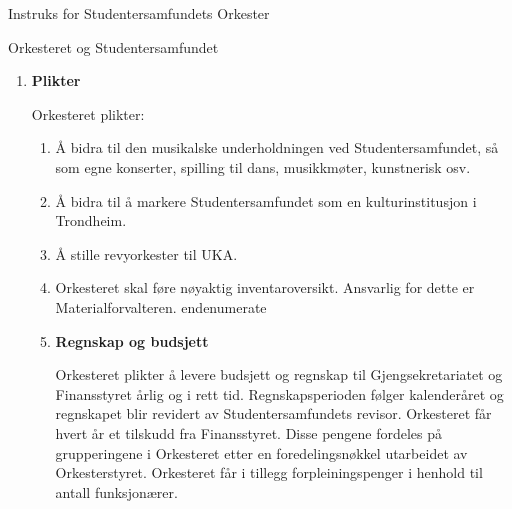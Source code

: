 \begin{instruks}{Instruks for Studentersamfundets Orkester}{ }{ }
\begin{instruksledd}{Orkesteret og Studentersamfundet}
\begin{enumerate}
                Orkesteret disponerer Musikerlåfte' under forutsetning av at instruksen for bruk av Musikerlåfte'
                blir fulgt.

                Studentersamfundet bevilger hvert år tilskudd til Orkesterets drift og kan bevilge midler til
                Orkesterets
                investeringer. Orkesteret og de faste gruppene kan også søke om ekstrabevilgninger fra Finansstyret
                for
                spesielle utgiftsposter. Orkesteret får utbetalt eventuelle godtgjørelser for utførte tjenester i
                Huset etter avtale
                i hvert enkelt tilfelle.

                Orkesteret kan etter avtale med Kontrollkontoret legge beslag på lokaler i Huset når dette er
                nødvendig for
                Orkesterets arbeid. Arbeidet skal utføres på en slik måte at det, så fremt det er mulig, ikke er til
                ulempe for
                annen utleie eller andre tilstelninger på Huset.

                Medlemmene av Orkesterstyret som har både tale- og stemmerett er funksjonærer ved Studentersamfundet
                i
                Trondhjem.

            \item \textbf{Plikter}

                Orkesteret plikter:

                \begin{enumerate}
                    \item Å bidra til den musikalske underholdningen ved Studentersamfundet, så som egne
                        konserter, spilling til
                        dans, musikkmøter, kunstnerisk osv.
                    \item Å bidra til å markere Studentersamfundet som en kulturinstitusjon i Trondheim.
                    \item Å stille revyorkester til UKA.
                    \item Orkesteret skal føre nøyaktig inventaroversikt. Ansvarlig for dette er
                        Materialforvalteren.
                        end{enumerate}

                    \item \textbf{Regnskap og budsjett}

                        Orkesteret plikter å levere budsjett og regnskap til Gjengsekretariatet og Finansstyret årlig og i
                        rett tid.
                        Regnskapsperioden følger kalenderåret og regnskapet blir revidert av Studentersamfundets revisor.
                        Orkesteret får hvert år et tilskudd fra Finansstyret. Disse pengene fordeles på grupperingene i
                        Orkesteret etter
                        en foredelingsnøkkel utarbeidet av Orkesterstyret. Orkesteret får i tillegg forpleiningspenger i
                        henhold til
                        antall funksjonærer.


\end{enumerate}
\end{enumerate}
\end{instruksledd}
\end{instruks}
